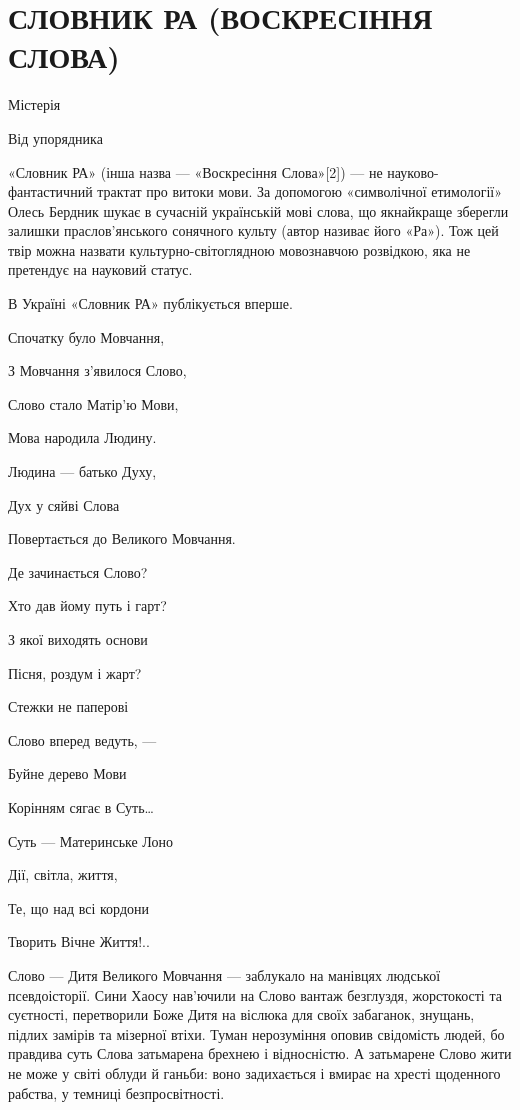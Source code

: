  
 

\section{СЛОВНИК РА (ВОСКРЕСІННЯ СЛОВА)}

Містерія

Від упорядника

«Словник РА» (інша назва — «Воскресіння Слова»[2]) — не науково-фантастичний
трактат про витоки мови. За допомогою «символічної етимології» Олесь Бердник
шукає в сучасній українській мові слова, що якнайкраще зберегли залишки
праслов’янського сонячного культу (автор називає його «Ра»). Тож цей твір можна
назвати культурно-світоглядною мовознавчою розвідкою, яка не претендує на
науковий статус.

В Україні «Словник РА» публікується вперше.

Спочатку було Мовчання,

З Мовчання з’явилося Слово,

Слово стало Матір’ю Мови,

Мова народила Людину.

Людина — батько Духу,

Дух у сяйві Слова

Повертається до Великого Мовчання.

Де зачинається Слово?

Хто дав йому путь і гарт?

З якої виходять основи

Пісня, роздум і жарт?

Стежки не паперові

Слово вперед ведуть, —

Буйне дерево Мови

Корінням сягає в Суть…

Суть — Материнське Лоно

Дії, світла, життя,

Те, що над всі кордони

Творить Вічне Життя!..

Слово — Дитя Великого Мовчання — заблукало на манівцях людської псевдоісторії.
Сини Хаосу нав’ючили на Слово вантаж безглуздя, жорстокості та суєтності,
перетворили Боже Дитя на віслюка для своїх забаганок, знущань, підлих замірів
та мізерної втіхи. Туман нерозуміння оповив свідомість людей, бо правдива суть
Слова затьмарена брехнею і відносністю. А затьмарене Слово жити не може у світі
облуди й ганьби: воно задихається і вмирає на хресті щоденного рабства, у
темниці безпросвітності.

